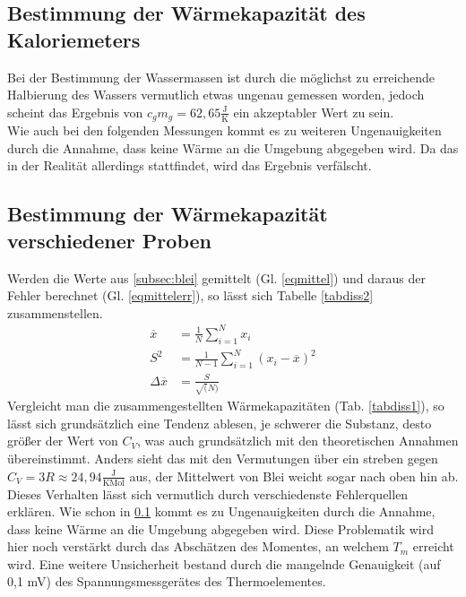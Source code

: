 \subsection{Bestimmung der Wärmekapazität des Kaloriemeters}\label{subsec:diss1}
Bei der Bestimmung der Wassermassen ist durch die möglichst zu erreichende Halbierung des Wassers
vermutlich etwas ungenau gemessen worden, jedoch scheint das Ergebnis von 
$c_gm_g=62,65\frac{\text{J}}{\text{K}}$ ein akzeptabler Wert zu sein.\\
Wie auch bei den folgenden Messungen kommt es zu weiteren Ungenauigkeiten durch die Annahme,
dass keine Wärme an die Umgebung abgegeben wird. Da das in der Realität allerdings stattfindet, wird
das Ergebnis verfälscht.
\subsection{Bestimmung der Wärmekapazität verschiedener Proben}
 
Werden die Werte aus \ref{subsec:blei} gemittelt (Gl. \ref{eqmittel}) und daraus der Fehler 
berechnet (Gl. \ref{eqmittelerr}), so lässt sich Tabelle \ref{tabdiss2} zusammenstellen.
\begin{align}
\overline x&=\frac{1}{N} \sum_{i=1}^N x_i \label{eqmittel} \\
S^2&=\frac{1}{N-1} \sum_{i=1}^N (x_i - \overline x)^2 \\
\Delta \overline x&=\frac{S}{\sqrt(N)} \label{eqmittelerr}
\end{align}
Vergleicht man die zusammengestellten Wärmekapazitäten (Tab. \ref{tabdiss1}), so lässt
sich grundsätzlich eine Tendenz ablesen, je schwerer die Substanz, desto größer der Wert von
$C_V$, was auch grundsätzlich mit den theoretischen Annahmen übereinstimmt. Anders sieht das mit
den Vermutungen über ein streben gegen $C_V=3R\approx24,94 \frac{\text{J}}{\text{K} \text{Mol}}$
aus, der Mittelwert von Blei weicht sogar nach oben hin ab.\\
Dieses Verhalten lässt sich vermutlich durch verschiedenste Fehlerquellen erklären. Wie schon in
\ref{subsec:diss1} kommt es zu Ungenauigkeiten durch die Annahme, dass keine Wärme an die Umgebung 
abgegeben wird. Diese Problematik wird hier noch verstärkt durch das Abschätzen des Momentes, an welchem
$T_m$ erreicht wird. Eine weitere Unsicherheit bestand durch die mangelnde Genauigkeit (auf 0,1 mV) des 
Spannungsmessgerätes des Thermoelementes.  